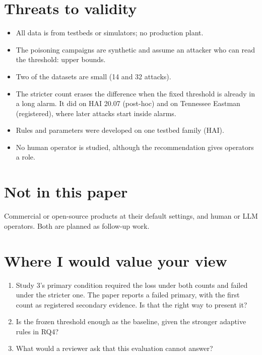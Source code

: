 \documentclass[9pt,a4paper]{extarticle}
\begin{document}
\section{Threats to validity}
\begin{itemize}
\item All data is from testbeds or simulators; no production plant.
\item The poisoning campaigns are synthetic and assume an attacker who can read the threshold: upper bounds.
\item Two of the datasets are small (14 and 32 attacks).
\item The stricter count erases the difference when the fixed threshold is already in a long alarm. It did
  on HAI 20.07 (post-hoc) and on Tennessee Eastman (registered), where later attacks start inside alarms.
\item Rules and parameters were developed on one testbed family (HAI).
\item No human operator is studied, although the recommendation gives operators a role.
\end{itemize}

\section{Not in this paper}
Commercial or open-source products at their default settings, and human or LLM operators. Both are planned
as follow-up work.

\section{Where I would value your view}
\begin{enumerate}
\item Study 3's primary condition required the loss under both counts and failed under the stricter one.
  The paper reports a failed primary, with the first count as registered secondary evidence. Is that the
  right way to present it?
\item Is the frozen threshold enough as the baseline, given the stronger adaptive rules in RQ4?
\item What would a reviewer ask that this evaluation cannot answer?
\end{enumerate}
\end{document}
